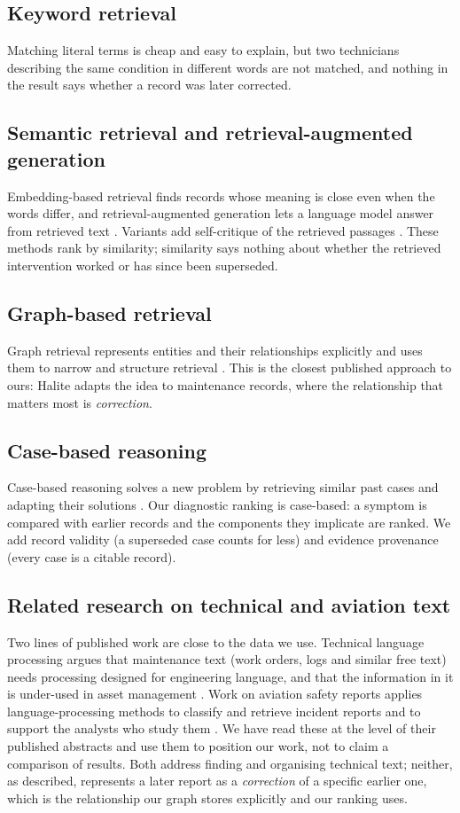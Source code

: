 \subsection{Keyword retrieval}
Matching literal terms is cheap and easy to explain, but two technicians describing the same condition in different words are not matched, and nothing in the result says whether a record was later corrected.

\subsection{Semantic retrieval and retrieval-augmented generation}
Embedding-based retrieval finds records whose meaning is close even when the words differ, and retrieval-augmented generation lets a language model answer from retrieved text \citep{lewis2020rag}. Variants add self-critique of the retrieved passages \citep{asai2023selfrag}. These methods rank by similarity; similarity says nothing about whether the retrieved intervention worked or has since been superseded.

\subsection{Graph-based retrieval}
Graph retrieval represents entities and their relationships explicitly and uses them to narrow and structure retrieval \citep{edge2024graphrag}. This is the closest published approach to ours: Halite adapts the idea to maintenance records, where the relationship that matters most is \emph{correction}.

\subsection{Case-based reasoning}
Case-based reasoning solves a new problem by retrieving similar past cases and adapting their solutions \citep{aamodt1994cbr}. Our diagnostic ranking is case-based: a symptom is compared with earlier records and the components they implicate are ranked. We add record validity (a superseded case counts for less) and evidence provenance (every case is a citable record).

\subsection{Related research on technical and aviation text}
Two lines of published work are close to the data we use. Technical language processing argues that maintenance text (work orders, logs and similar free text) needs processing designed for engineering language, and that the information in it is under-used in asset management \citep{brundage2021tlp}. Work on aviation safety reports applies language-processing methods to classify and retrieve incident reports and to support the analysts who study them \citep{tanguy2016aviation}. We have read these at the level of their published abstracts and use them to position our work, not to claim a comparison of results. Both address finding and organising technical text; neither, as described, represents a later report as a \emph{correction} of a specific earlier one, which is the relationship our graph stores explicitly and our ranking uses.

